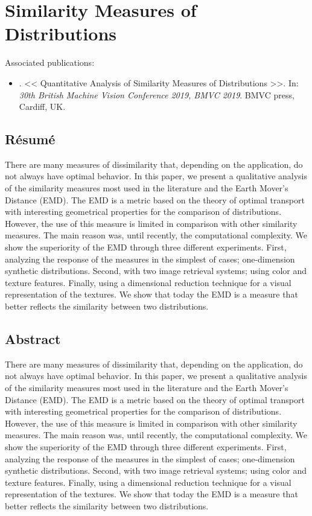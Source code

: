 
\chapter{Similarity Measures of Distributions}
Associated publications: \vspace{-2mm}

\begin{itemize}
	\item \citep{Bazan.Dokladal.ea:BMVC:2019}. << Quantitative Analysis of Similarity Measures of
Distributions >>. In: \textit{30th British Machine Vision Conference 2019, BMVC 2019}. BMVC press, Cardiff, UK.
\end{itemize}

\section*{Résumé}
\noindent There are many measures of dissimilarity that, depending on the application, do not always have optimal behavior. In this paper, we present a qualitative analysis of the similarity measures most used in the literature and the Earth Mover's Distance (EMD).  The EMD is a metric based on the theory of optimal transport with interesting geometrical properties for the comparison of distributions. However, the use of this measure is limited in comparison with other similarity measures. The main reason was, until recently, the computational complexity. We show the superiority of the EMD through three different experiments. First, analyzing the response of the measures in the simplest of cases; one-dimension synthetic distributions. Second, with two image retrieval systems; using color and texture features. Finally, using a dimensional reduction technique for a visual representation of the textures. We show that today the EMD is a measure that better reflects the similarity between two distributions.

\section*{Abstract}
\noindent There are many measures of dissimilarity that, depending on the application, do not always have optimal behavior. In this paper, we present a qualitative analysis of the similarity measures most used in the literature and the Earth Mover's Distance (EMD).  The EMD is a metric based on the theory of optimal transport with interesting geometrical properties for the comparison of distributions. However, the use of this measure is limited in comparison with other similarity measures. The main reason was, until recently, the computational complexity. We show the superiority of the EMD through three different experiments. First, analyzing the response of the measures in the simplest of cases; one-dimension synthetic distributions. Second, with two image retrieval systems; using color and texture features. Finally, using a dimensional reduction technique for a visual representation of the textures. We show that today the EMD is a measure that better reflects the similarity between two distributions.

